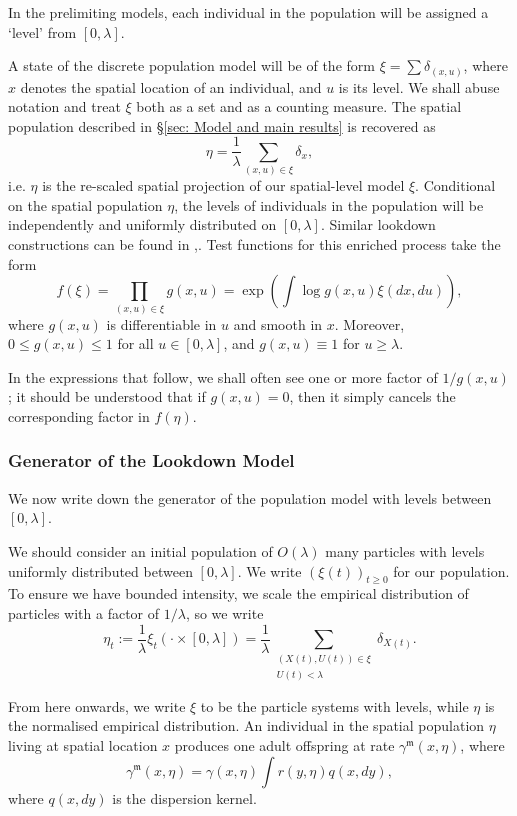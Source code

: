 \documentclass[12pt]{article}
\begin{document}
In the prelimiting models,
each individual in the population
will be assigned a `level' from $[0,\lambda]$.


A state of the discrete population model will be of the form $\xi=\sum\delta_{(x,u)}$,
where $x$ denotes the spatial location
of an individual, and $u$ is its level.
We shall abuse notation and treat $\xi$ both as a set and as a counting measure.
The spatial population described in \S \ref{sec: Model and main results} is recovered as
$$\eta=\frac{1}{\lambda}\sum_{(x,u)\in\xi}\delta_x,$$
i.e. $\eta$ is the re-scaled spatial projection of our spatial-level model $\xi$. 
Conditional on the spatial population $\eta$,
the levels of individuals in the population
will be independently and uniformly distributed
on $[0,\lambda]$.
Similar lookdown constructions can be found 
in \cite{etheridge/kurtz:2018},\cite{kurtz/rodrigues:2011}.
Test functions for this enriched process take the form
\begin{equation}
\label{test functions}
f(\xi)=\prod_{(x,u)\in \xi}g(x,u)=\exp\left(\int \log g(x,u)\xi(dx, du)\right),
\end{equation}
where $g(x,u)$ is differentiable in $u$ and 
smooth in $x$.
Moreover, $0\leq g(x,u) \leq 1$ for all $u\in [0,\lambda]$,
and $g(x,u)\equiv 1$ for $u\geq \lambda$.

In the expressions that follow,
we shall often see one or more factor of $1/g(x,u)$;
it should be understood that if $g(x,u)=0$,
then it simply cancels 
the corresponding factor in $f(\eta)$.

\subsubsection*{Generator of the Lookdown Model}

We now write down the generator of
the population model with levels between $[0, \lambda]$.

We should consider an initial population of $O(\lambda)$ many particles with levels
uniformly distributed between $[0, \lambda]$.
We write $(\xi(t))_{t \geq 0}$
for our population.
To ensure we have bounded intensity, 
we scale the empirical distribution of particles with a factor of $1/\lambda$,
so we write
$$\eta_t:=\frac{1}{\lambda}\xi_t(\cdot \times [0,\lambda])=
\frac{1}{\lambda}\sum\limits_{\substack{(X(t),U(t))\in \xi \\ U(t) < \lambda}} \delta_{X(t)}.$$ 

From here onwards,
we write $\xi$ to be the particle systems with levels,
while $\eta$ is the normalised empirical distribution.
An individual in the spatial population $\eta$ living at spatial location $x$
produces one adult offspring at rate $\gamma^{\mathfrak{m}}(x, \eta)$, where
$$\gamma^{\mathfrak{m}}(x,\eta)=\gamma(x,\eta) \int r (y, \eta)q(x,dy),$$
where $q(x,dy)$ is the dispersion kernel.
\end{document}
